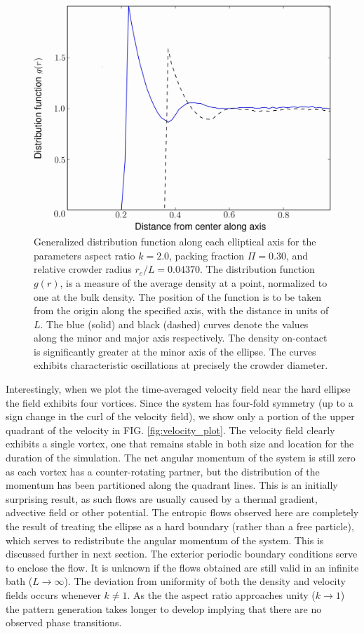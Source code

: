 \begin{figure}
\includegraphics[width=\figurewidthSINGLE]{entropic_flow_paper/FIG2_EDIT.jpg}
\caption{Generalized distribution function along each elliptical axis for the parameters aspect ratio $k=2.0$, packing fraction $\Pi=0.30$, and relative crowder radius $r_c/L=0.04370$. The distribution function $g(r)$, is a measure of the average density at a point, normalized to one at the bulk density. The position of the function is to be taken from the origin along the specified axis, with the distance in units of $L$. The blue (solid) and black (dashed) curves denote the values along the minor and major axis respectively. The density on-contact is significantly greater at the minor axis of the ellipse. The curves exhibits characteristic oscillations at precisely the crowder diameter. }
\label{fig:radial_plot}
\end{figure}

Interestingly, when we plot the time-averaged velocity field near the hard ellipse the field exhibits four vortices. Since the system has four-fold symmetry (up to a sign change in the curl of the velocity field), we show only a portion of the upper quadrant of the velocity in FIG. \ref{fig:velocity_plot}. The velocity field clearly exhibits a single vortex, one that remains stable in both size and location for the duration of the simulation. The net angular momentum of the system is still zero as each vortex has a counter-rotating partner, but the distribution of the momentum has been partitioned along the quadrant lines. This is an initially surprising result, as such flows are usually caused by a thermal gradient, advective field or other potential. The entropic flows observed here are completely the result of treating the ellipse as a hard boundary (rather than a free particle), which serves to redistribute the angular momentum of the system. This is discussed further in next section. The exterior periodic boundary conditions serve to enclose the flow. It is unknown if the flows obtained are still valid in an infinite bath ($L \rightarrow \infty$). The deviation from uniformity of both the density and velocity fields occurs whenever $k \neq 1$. As the the aspect ratio approaches unity ($k \rightarrow 1$) the pattern generation takes longer to develop implying that there are no observed phase transitions.

